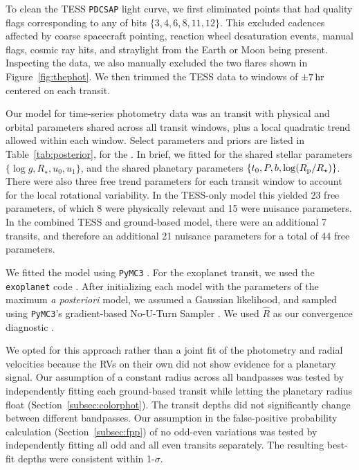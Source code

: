 \documentclass[12pt,twocolumn,tighten]{aastex63}
\begin{document}
To clean the TESS \texttt{PDCSAP} light curve, we first eliminated
points that had quality flags corresponding to any of bits $\{3, 4, 6,
8, 11, 12\}$.  This excluded cadences affected by coarse spacecraft
pointing, reaction wheel desaturation events, manual flags, cosmic ray
hits, and straylight from the Earth or Moon being present.  Inspecting
the data, we also manually excluded the two flares shown in
Figure~\ref{fig:thephot}.  We then trimmed the TESS data to windows of
$\pm 7\,{\rm hr}$ centered on each transit.

Our model for time-series photometry data was an
\citet{exoplanet:agol20} transit with physical and orbital parameters
shared across all transit windows, plus a local quadratic trend
allowed within each window.  Select parameters and priors are listed
in Table~\ref{tab:posterior}, for the .  In brief, we fitted for the
shared stellar parameters $\{\log g, R_\star, u_0, u_1\}$, and the
shared planetary parameters $\{t_0, P, b, \log(R_{\rm p}/R_\star)\}$.
There were also three free trend parameters for each transit window to
account for the local rotational variability.  In the TESS-only model
this yielded 23 free parameters, of which 8 were physically relevant
and 15 were nuisance parameters.  In the combined TESS and
ground-based model, there were an additional 7 transits, and therefore
an additional 21 nuisance parameters for a total of 44 free
parameters.

We fitted the model using \texttt{PyMC3}
\citep{salvatier_2016_PyMC3,exoplanet:theano}.  For the exoplanet
transit, we used the \texttt{exoplanet} code
\citep{exoplanet:exoplanet}.  After initializing each model with the
parameters of the maximum {\it a posteriori} model, we assumed a
Gaussian likelihood, and sampled using \texttt{PyMC3}'s gradient-based
No-U-Turn Sampler \citep{hoffman_no-u-turn_2014}. We used $\hat{R}$ as
our convergence diagnostic \citep{gelman_inference_1992}.

We opted for this approach rather than a joint fit of the photometry
and radial velocities because the RVs on their own did not show
evidence for a planetary signal.  
Our assumption of a constant radius across all bandpasses was tested
by independently fitting each ground-based transit while letting the
planetary radius float (Section~\ref{subsec:colorphot}). The transit
depths did not significantly change between different bandpasses.  Our
assumption in the false-positive probability calculation
(Section~\ref{subsec:fpp}) of no odd-even variations was tested by
independently fitting all odd and all even transits separately.  The
resulting best-fit depths were consistent within 1-$\sigma$.
\end{document}
